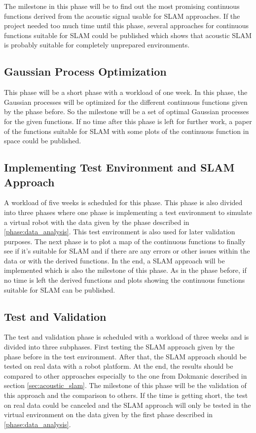 The milestone in this phase will be to find out the most promising continuous functions derived from the acoustic signal usable for SLAM approaches. If the project needed too much time until this phase, several approaches for continuous functions suitable for SLAM could be published which shows that acoustic SLAM is probably suitable for completely unprepared environments.

\subsection{Gaussian Process Optimization}
This phase will be a short phase with a workload of one week. In this phase, the Gaussian processes will be optimized for the different continuous functions given by the phase before. So the milestone will be a set of optimal Gaussian processes for the given functions. If no time after this phase is left for further work, a paper of the functions suitable for SLAM with some plots of the continuous function in space could be published.

\subsection{Implementing Test Environment and SLAM Approach}
A workload of five weeks is scheduled for this phase. This phase is also divided into three phases where one phase is implementing a test environment to simulate a virtual robot with the data given by the phase described in \ref{phase:data_analysis}. This test environment is also used for later validation purposes. The next phase is to plot a map of the continuous functions to finally see if it's suitable for SLAM and if there are any errors or other issues within the data or with the derived functions. In the end, a SLAM approach will be implemented which is also the milestone of this phase. As in the phase before, if no time is left the derived functions and plots showing the continuous functions suitable for SLAM can be published. 

\subsection{Test and Validation}
The test and validation phase is scheduled with a workload of three weeks and is divided into three subphases. First testing the SLAM approach given by the phase before in the test environment. After that, the SLAM approach should be tested on real data with a robot platform. At the end, the results should be compared to other approaches especially to the one from Dokmanic \cite{dokmanic_roomrecslam_2016} described in section \ref{sec:acoustic_slam}. The milestone of this phase will be the validation of this approach and the comparison to others. If the time is getting short, the test on real data could be canceled and the SLAM approach will only be tested in the virtual environment on the data given by the first phase described in \ref{phase:data_analysis}. 


